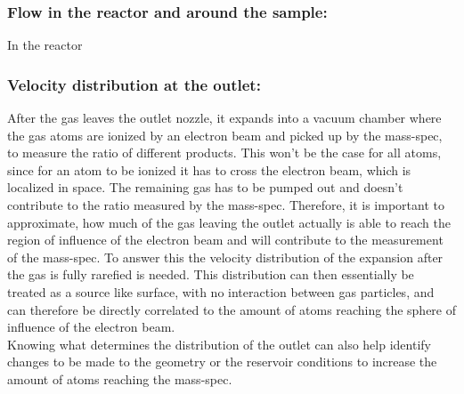 \subsubsection{Flow in the reactor and around the sample:}

	In the reactor 

\subsubsection{Velocity distribution at the outlet:}

	After the gas leaves the outlet nozzle, it expands into a vacuum chamber where the gas atoms are ionized by an electron beam and picked up by the mass-spec, to measure the ratio of different products.
	This won't be the case for all atoms, since for an atom to be ionized it has to cross the electron beam, which is localized in space.
	The remaining gas has to be pumped out and doesn't contribute to the ratio measured by the mass-spec.
	Therefore, it is important to approximate, how much of the gas leaving the outlet actually is able to reach the region of influence of the electron beam and will contribute to the measurement of the mass-spec.
	To answer this the velocity distribution of the expansion after the gas is fully rarefied is needed.
	This distribution can then essentially be treated as a source like surface, with no interaction between gas particles, and can therefore be directly correlated to the amount of atoms reaching the sphere of influence of the electron beam.\\
	Knowing what determines the distribution of the outlet can also help identify changes to be made to the geometry or the reservoir conditions to increase the amount of atoms reaching the mass-spec.

